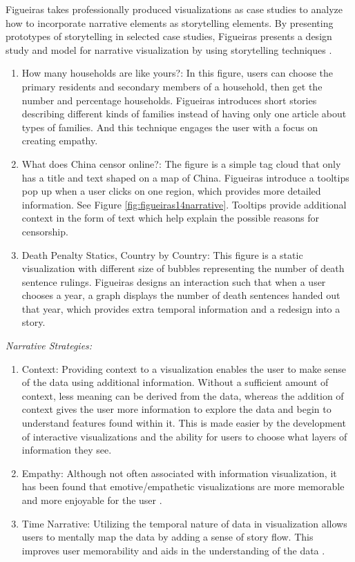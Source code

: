 \documentclass{egpubl}
\begin{document}
Figueiras takes professionally produced visualizations as case studies to analyze how to incorporate narrative elements as storytelling elements. By presenting prototypes of storytelling in selected case studies, Figueiras presents a design study and model for narrative visualization by using storytelling techniques \cite{figueiras}.
\begin{enumerate}
\item How many households are like yours?: In this figure, users can choose the primary residents and secondary members of a household, then get the number and percentage households. Figueiras \cite{figueiras} introduces short stories describing different kinds of families instead of having only one article about types of families. And this technique engages the user with a focus on creating empathy.
\item What does China censor online?: The figure is a simple tag cloud that only has a title and text shaped on a map of China. Figueiras \cite{figueiras} introduce a tooltips pop up when a user clicks on one region, which provides more detailed information. See Figure \ref{fig:figueiras14narrative}. Tooltips provide additional context in the form of text which help explain the possible reasons for censorship. 
\item Death Penalty Statics, Country by Country: This figure is a static visualization with different size of bubbles representing the number of death sentence rulings. Figueiras \cite{figueiras} designs an interaction such that when a user chooses a year, a graph displays the number of death sentences handed out that year, which provides extra temporal information and a redesign into a story. 
\end{enumerate}
\textit{Narrative Strategies:} 
\begin{enumerate}
		
	\item Context: Providing context to a visualization enables the user to make sense of the data using additional information. Without a sufficient amount of context, less meaning can be derived from the data, whereas the addition of context gives the user more information to explore the data and begin to understand features found within it. This is made easier by the development of interactive visualizations and the ability for users to choose what layers of information they see. 
		
	\item Empathy: Although not often associated with information visualization, it has been found that emotive/empathetic visualizations are more memorable and more enjoyable for the user \cite{Kosara}.
		
	\item Time Narrative: Utilizing the temporal nature of data in visualization allows users to mentally map the data by adding a sense of story flow. This improves user memorability and aids in the understanding of the data \cite{Kosara}.
		
\end{enumerate}
\end{document}
